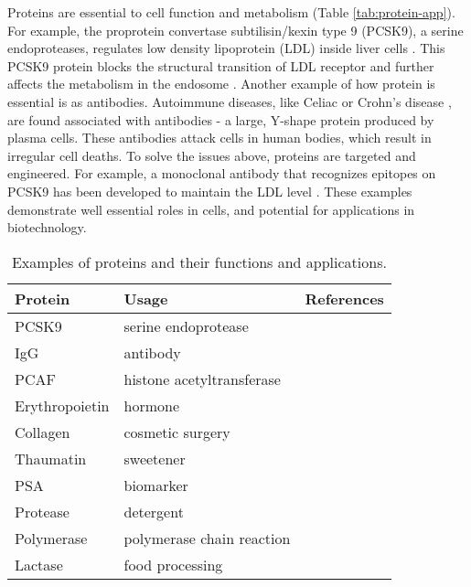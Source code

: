 \begin{refsection}
Proteins are essential to cell function and metabolism
\cite{Lambert2012,Horton2007,Dessein2008} (Table \ref{tab:protein-app}). For
example, the proprotein convertase subtilisin/kexin type 9 (PCSK9), a serine
endoproteases, regulates low density lipoprotein (LDL) inside liver
cells \cite{Lambert2012,Horton2007}. This PCSK9 protein blocks the structural
transition of LDL receptor and further affects the metabolism in the endosome
\cite{Lambert2012}. Another example of how protein is essential is as
antibodies. Autoimmune diseases, like Celiac \cite{Dessein2008} or Crohn's
disease \cite{Sollid2005, Meize-Grochowski}, are found associated with
antibodies - a large, Y-shape protein produced by plasma cells. These
antibodies attack cells in human bodies, which result in irregular cell deaths.
To solve the issues above, proteins are targeted and engineered. For example,
a monoclonal antibody that recognizes epitopes on PCSK9 has been developed to
maintain the LDL level \cite{Lambert2012}. These examples demonstrate well
essential roles in cells, and potential for applications in biotechnology.   
\begin{table}[htbp]
    \centering
    \caption[Examples of proteins and their funtions and
    applications.]{Examples of proteins and their functions and applications.}
    \begin{tabular}{ lll }
        \hline
        Protein & Usage & References \\
        \hline
        
        PCSK9 & serine endoprotease & \cite{Lambert2012,Horton2007} \\
        IgG & antibody & \cite{Sollid2005, Meize-Grochowski} \\
        PCAF & histone acetyltransferase & \cite{Mehta2011a} \\
        Erythropoietin & hormone & \cite{Haroon2003,Siren2001} \\
        Collagen & cosmetic surgery & \cite{Bella1995} \\
        Thaumatin & sweetener & \cite{Green1999} \\
        PSA & biomarker & \cite{Crawford2014} \\
        Protease & detergent & \cite{Kirk2002} \\
        Polymerase & polymerase chain reaction & \cite{Berg2002} \\
        Lactase & food processing & \cite{Wiseman1993} \\


\end{tabular}
\end{table}
\end{refsection}
